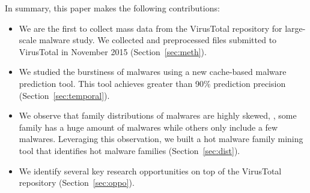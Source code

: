 


In summary, this paper makes the following contributions:

\begin{itemize}

\item We are the first to collect mass data from the VirusTotal repository for large-scale malware study.
We collected and preprocessed files submitted to VirusTotal in November 2015 (Section~\ref{sec:meth}).

\item We studied the burstiness of malwares using a new 
cache-based malware prediction tool.
This tool achieves greater than 90\% prediction precision (Section~\ref{sec:temporal}). 

\item We observe that family distributions of malwares are highly skewed, 
\ie, some family has a huge amount of malwares while others only include a few malwares. 
Leveraging this observation, we built a hot malware family mining tool that identifies hot 
malware families (Section~\ref{sec:dist}).

\item We identify several key research opportunities on top of the VirusTotal repository (Section~\ref{sec:oppo}). 

\end{itemize}


